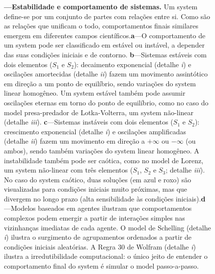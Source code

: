\documentclass[./main.tex]{subfiles}
\begin{document}
\begin{figure}[t!]
	{\textbf{---\;Estabilidade e comportamento de sistemas.} Um \gls{system} define-se por um conjunto de partes com relações entre si. Como são as relações que unificam o todo, comportamentos finais similares emergem em diferentes campos científicos.\;\textbf{a}\;---\;O comportamento de um \gls{system} pode ser classificado em estável ou instável, a depender das suas condições iniciais e de contorno. \;\textbf{b}\;---\;Sistemas estáveis com dois elementos ($S_1$ e $S_2$): decaimento exponencial (detalhe \textrm{\textit{i}}) e oscilações amortecidas (detalhe \textrm{\textit{ii}}) fazem um movimento assintótico em direção a um ponto de equilíbrio, sendo variações do \gls{system} linear homogêneo. Um \gls{system} estável também pode assumir oscilações eternas em torno do ponto de equilíbrio, como no caso do \gls{model} presa-predador de Lotka-Volterra, um \gls{system} não-linear (detalhe \textrm{\textit{iii}}). \;\textbf{c}\;---\;Sistemas instáveis com dois elementos ($S_1$ e $S_2$): crescimento exponencial (detalhe \textrm{\textit{i}}) e oscilações amplificadas (detalhe \textrm{\textit{ii}}) fazem um movimento em direção a $+\infty$ ou $-\infty$ (ou ambos), sendo também variações do \gls{system} linear homogêneo. A instabilidade também pode ser caótica, como no \gls{model} de Lorenz, um \gls{system} não-linear com três elementos ($S_1$, $S_2$ e $S_3$; detalhe \textrm{\textit{iii}}). No caso do \gls{system} caótico, duas soluções (em azul e roxo) são visualizadas para condições iniciais muito próximas, mas que divergem no longo prazo (alta sensibilidade às condições iniciais).\;\textbf{d}\;---\;Modelos baseados em agentes ilustram que comportamentos complexos podem emergir a partir de interações simples nas vizinhanças imediatas de cada agente. O \gls{model} de Schelling (detalhe \textrm{\textit{i}}) ilustra o surgimento de agrupamentos ordenados a partir de condições iniciais aleatórias. A Regra 30 de Wolfram (detalhe \textrm{\textit{i}}) ilustra a irredutibilidade computacional: o único jeito de entender o comportamento final do \gls{system} é simular o \gls{model} passo-a-passo. 
	}
\label{fig:sys:systems}  %
\end{figure}
\end{document}
